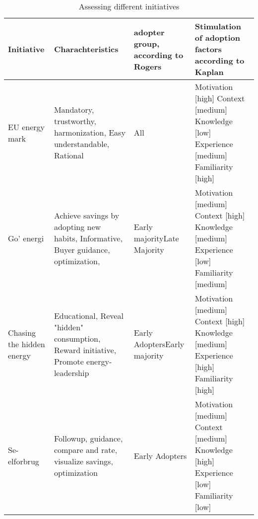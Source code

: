\documentclass[journal]{IEEEtran}
\begin{document}
\begin{table*}[t2]

\caption{Assessing different initiatives} %
\centering  %

\begin{tabular}{|p{} |p{3.5cm} |p{2.5cm} |p{4.5cm} |} %
\hline\hline                        %

Initiative & Charachteristics & adopter group, according to Rogers & Stimulation of adoption factors according to Kaplan\\ [0.5ex] %
\hline                  %

EU energy mark & 
Mandatory, trustworthy, harmonization, Easy understandable, Rational  & 
All &
Motivation  [high] \newline 
Context	    [medium] \newline 
Knowledge	[low] \newline 
Experience  [medium] \newline 
Familiarity [high] \\
\hline

Go' energi & 
Achieve savings by adopting new habits, Informative, Buyer guidance, optimization, & 
Early majority\newline  Late Majority &
Motivation  [medium] \newline 
Context	    [high] \newline 
Knowledge	[medium] \newline 
Experience  [low] \newline 
Familiarity [medium] \\
\hline

Chasing the hidden energy & 
Educational, Reveal "hidden" consumption, Reward initiative, Promote energy-leadership & Early Adopters\newline Early majority &
Motivation  [medium] \newline 
Context	    [high] \newline 
Knowledge	[medium] \newline 
Experience  [high] \newline 
Familiarity [high] \\
\hline

Se-elforbrug & 
Followup, guidance, compare and rate, visualize savings, optimization  & 
Early Adopters &
Motivation  [medium] \newline 
Context	    [medium] \newline 
Knowledge	[high] \newline 
Experience  [low] \newline 
Familiarity [low] \\
\hline
\end{tabular}
\label{table:asses_init} %
\end{table*}
\end{document}
